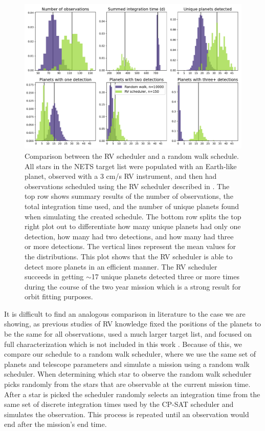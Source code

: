 \begin{figure}
  \begin{center}
    \includegraphics[width=1\textwidth]{ch4/figures/final_results.pdf}
  \end{center}
  \caption{Comparison between the RV scheduler and a random walk schedule.
  All stars in the NETS target list were populated with an Earth-like planet,
  observed with a 3 cm/s RV instrument, and then had observations scheduled
  using the RV scheduler described in . The top row shows
  summary results of the number of observations, the total integration time
used, and the number of unique planets found when simulating the created
schedule. The bottom row splits the top right plot out to differentiate how
many unique planets had only one detection, how many had two detections, and
how many had three or more detections. The vertical lines represent the mean values
for the distributions. This plot shows that the RV scheduler is able to detect
more planets in an efficient manner. The RV scheduler succeeds in getting $\sim$17
unique planets detected three or more times during the course of the two year
mission which is a strong result for orbit fitting purposes.}
  \label{fig:randomwalkhist}
\end{figure}

It is difficult to find
an analogous comparison in literature to the case we are showing, as previous
studies of RV knowledge fixed the positions of the planets to be the same for
all observations, used a much larger target list, and focused on full
characterization which is not included in this work
\citep{morganExplorationExpectedNumber2022a}. Because of this, we compare our
schedule to a random walk scheduler, where we use the same set of planets and
telescope parameters and simulate a mission using a random walk scheduler. When
determining which star to observe the random walk scheduler picks randomly from
the stars that are observable at the current mission time. After a star is
picked the scheduler randomly selects an integration time from the same set of
discrete integration times used by the CP-SAT scheduler and simulates the
observation. This process is repeated until an observation would end after the
mission's end time.

